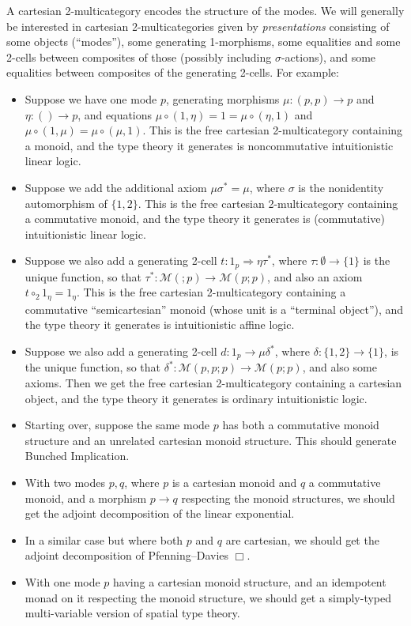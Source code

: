 \documentclass{amsart}
\theoremstyle{definition}
\def\M{\mathcal{M}}
\let\To\Rightarrow
\newcommand\comph[2]{\ensuremath{#1 \mathbin{\circ_2} #2}}
\begin{document}
A cartesian 2-multicategory encodes the structure of the modes.
We will generally be interested in cartesian 2-multicategories given by \emph{presentations} consisting of some objects (``modes''), some generating 1-morphisms, some equalities and some 2-cells between composites of those (possibly including $\sigma$-actions), and some equalities between composites of the generating 2-cells.
For example:
\begin{itemize}
\item Suppose we have one mode $p$, generating morphisms $\mu:(p,p)\to p$ and $\eta:()\to p$, and equations $\mu\circ (1,\eta) = 1 = \mu\circ (\eta,1)$ and $\mu\circ (1,\mu) = \mu \circ (\mu,1)$.
  This is the free cartesian 2-multicategory containing a monoid, and the type theory it generates is noncommutative intuitionistic linear logic.
\item Suppose we add the additional axiom $\mu\sigma^* = \mu$, where $\sigma$ is the nonidentity automorphism of $\{1,2\}$.
  This is the free cartesian 2-multicategory containing a commutative monoid, and the type theory it generates is (commutative) intuitionistic linear logic.
\item Suppose we also add a generating 2-cell $t:1_p \To \eta\tau^*$, where $\tau:\emptyset \to \{1\}$ is the unique function, so that $\tau^* : \M(;p) \to \M(p;p)$, and also an axiom $\comph{t}{1_\eta} = 1_\eta$.
  This is the free cartesian 2-multicategory containing a commutative ``semicartesian'' monoid (whose unit is a ``terminal object''), and the type theory it generates is intuitionistic affine logic.
\item Suppose we also add a generating 2-cell $d:1_p \to \mu\delta^*$, where $\delta:\{1,2\} \to \{1\}$, is the unique function, so that $\delta^* : \M(p,p;p) \to \M(p;p)$, and also some axioms.
  Then we get the free cartesian 2-multicategory containing a cartesian object, and the type theory it generates is ordinary intuitionistic logic.
\item Starting over, suppose the same mode $p$ has both a commutative monoid structure and an unrelated cartesian monoid structure.
  This should generate Bunched Implication.
\item With two modes $p,q$, where $p$ is a cartesian monoid and $q$ a commutative monoid, and a morphism $p\to q$ respecting the monoid structures, we should get the adjoint decomposition of the linear exponential.
\item In a similar case but where both $p$ and $q$ are cartesian, we should get the adjoint decomposition of Pfenning--Davies $\Box$.
\item With one mode $p$ having a cartesian monoid structure, and an idempotent monad on it respecting the monoid structure, we should get a simply-typed multi-variable version of spatial type theory.
\end{itemize}
\end{document}
